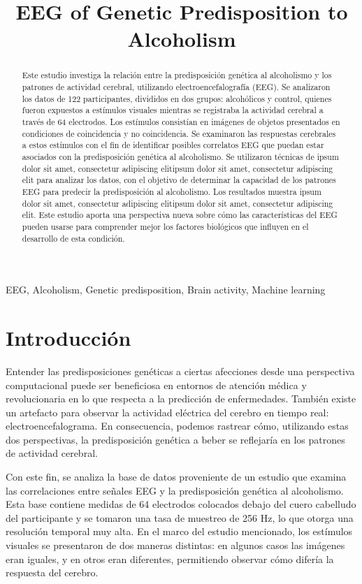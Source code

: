 \documentclass[conference]{IEEEtran}
\title{EEG of Genetic Predisposition to Alcoholism}
\author{
    \IEEEauthorblockN{Jyns Ordóñez}
    \IEEEauthorblockA{
        UTEC\\
        jyns.ordonez@utec.edu.pe}
    \and
    \IEEEauthorblockN{Mayra Medrano}
    \IEEEauthorblockA{
        UTEC\\
        mayra.medrano@utec.edu.pe}
    \and
    \IEEEauthorblockN{Jean P. Cuzcano}
    \IEEEauthorblockA{
        UTEC\\
        jean.cuzcano@utec.edu.pe}
    \and
    \IEEEauthorblockN{Jose Huayhua}
    \IEEEauthorblockA{
        UTEC\\
        jose.huayhua@utec.edu.pe}
}
\begin{document}
\maketitle

\begin{abstract}
Este estudio investiga la relación entre la predisposición genética al alcoholismo y los patrones de actividad cerebral, utilizando electroencefalografía (EEG). Se analizaron los datos de 122 participantes, divididos en dos grupos: alcohólicos y control, quienes fueron expuestos a estímulos visuales mientras se registraba la actividad cerebral a través de 64 electrodos. Los estímulos consistían en imágenes de objetos presentados en condiciones de coincidencia y no coincidencia. Se examinaron las respuestas cerebrales a estos estímulos con el fin de identificar posibles correlatos EEG que puedan estar asociados con la predisposición genética al alcoholismo. Se utilizaron técnicas de ipsum dolor sit amet, consectetur adipiscing elitipsum dolor sit amet, consectetur adipiscing elit para analizar los datos, con el objetivo de determinar la capacidad de los patrones EEG para predecir la predisposición al alcoholismo. Los resultados muestra ipsum dolor sit amet, consectetur adipiscing elitipsum dolor sit amet, consectetur adipiscing elit. Este estudio aporta una perspectiva nueva sobre cómo las características del EEG pueden usarse para comprender mejor los factores biológicos que influyen en el desarrollo de esta condición.
\end{abstract}


\begin{IEEEkeywords}
EEG, Alcoholism, Genetic predisposition, Brain activity, Machine learning
\end{IEEEkeywords}

\section{Introducción}
Entender las predisposiciones genéticas a ciertas afecciones desde una perspectiva computacional puede ser beneficiosa en entornos de atención médica y revolucionaria en lo que respecta a la predicción de enfermedades. También existe un artefacto para observar la actividad eléctrica del cerebro en tiempo real: electroencefalograma. En consecuencia, podemos rastrear cómo, utilizando estas dos perspectivas, la predisposición genética a beber se reflejaría en los patrones de actividad cerebral.

Con este fin, se analiza la base de datos proveniente de un estudio que examina las correlaciones entre señales EEG y la predisposición genética al alcoholismo. Esta base contiene medidas de 64 electrodos colocados debajo del cuero cabelludo del participante y se tomaron una tasa de muestreo de 256 Hz, lo que otorga una resolución temporal muy alta. En el marco del estudio mencionado, los estímulos visuales se presentaron de dos maneras distintas: en algunos casos las imágenes eran iguales, y en otros eran diferentes, permitiendo observar cómo difería la respuesta del cerebro.
\end{document}
